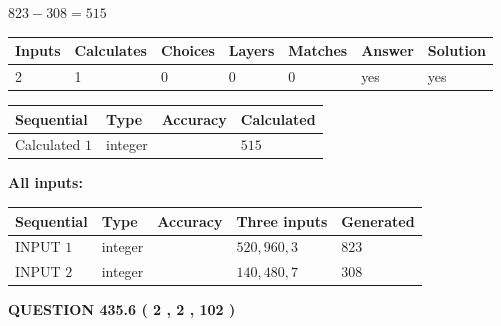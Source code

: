 \documentclass{ctexart}
\begin{document}
 

$ %
823 -  %
308=   %
515$
 
 
\noindent{}
 
 

 
   
   
   
   
\noindent\begin{tabular}{|l|l|l|l|l|l|l|}
 \hline
Inputs & Calculates & Choices & Layers & Matches & Answer & Solution \\ \hline
 2  & 
 1  & 
 0
  & 
 0  & 
 0  & 
  yes & 
  yes 
  \\ \hline
 \end{tabular}
   
   
   
   
\noindent{}
   
   
  
  
\noindent\begin{tabular}{|l|l|l|l|}
\hline
 Sequential & Type & Accuracy & Calculated \\ 
\hline
 
 
  Calculated $  1 $ & integer &  & 
  $ 515 $ 
 \\  \hline  
 \end{tabular}
   
   
   
   
\noindent\vspace{0.1in}\hspace{-0.08in} {\textbf{\Large{All inputs: }}}
   
   
  
  
\noindent\begin{tabular}{|l|l|l|l|l|}
\hline
 Sequential & Type & Accuracy & Three inputs & Generated \\ 
\hline
 
 
  INPUT $  1 $ & integer &  & $
 520
 , 
 960
 , 
 3
 $ & $ 823 $ 
 \\  \hline  
 
 
  INPUT $  2 $ & integer &  & $
 140
 , 
 480
 , 
 7
 $ & $ 308 $ 
 \\  \hline  
 \end{tabular}
   
   
  
\vspace{0.2in}
  
{\textbf{\Large{QUESTION
435.6 
 ( 2 , 2 , 102 )
}}}
  
\end{document}
